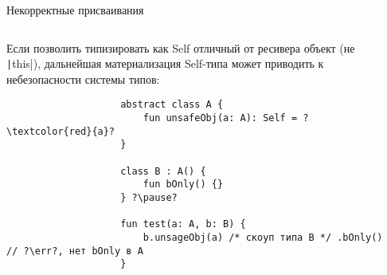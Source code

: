 \documentclass[aspectratio=169,usenames,dvipsnames]{beamer}
\newcommand{\err}[0]{\textcolor{red}{ошибка}}
\begin{document}
    \begin{frame}[fragile]{Некорректные присваивания}
        \begin{columns}[onlytextwidth]
            \begin{column}{0.99\textwidth}
                Если позволить типизировать как Self отличный от ресивера объект (не \texttt|this|), дальнейшая материализация Self-типа может приводить к небезопасности системы типов:
                \pause
                \begin{verbatim}
                    abstract class A {
                        fun unsafeObj(a: A): Self = ?\textcolor{red}{a}?
                    }

                    class B : A() {
                        fun bOnly() {}
                    } ?\pause?

                    fun test(a: A, b: B) {
                        b.unsageObj(a) /* скоуп типа B */ .bOnly() // ?\err?, нет bOnly в A
                    }
                \end{verbatim}
            \end{column}\hfill%
            \begin{column}{0.0\textwidth}
            \end{column}
        \end{columns}
    \end{frame}
\end{document}
